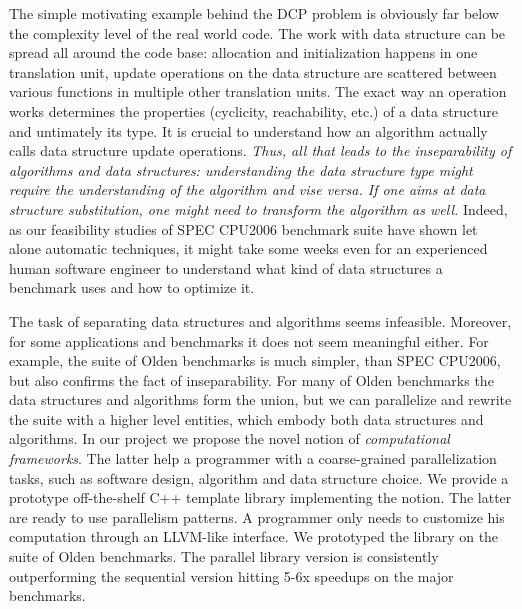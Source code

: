 \begin{description}[style=unboxed,leftmargin=0cm]
\item[Real world code complexity level] The simple motivating example behind the DCP problem is obviously far below the complexity level of the real world code. The work with data structure can be spread all around the code base: allocation and initialization happens in one translation unit, update operations on the data structure are scattered between various functions in multiple other translation units. The exact way an operation works determines the properties (cyclicity, reachability, etc.) of a data structure and untimately its type. It is crucial to understand how an algorithm actually calls data structure update operations. \textit{Thus, all that leads to the inseparability of algorithms and data structures: understanding the data structure type might require the understanding of the algorithm and vise versa. If one aims at data structure substitution, one might need to transform the algorithm as well.} Indeed, as our feasibility studies of SPEC CPU2006 benchmark suite have shown let alone automatic techniques, it might take some weeks even for an experienced human software engineer to understand what kind of data structures a benchmark uses and how to optimize it.
\end{description}
\quad The task of separating data structures and algorithms seems infeasible. Moreover, for some applications and benchmarks it does not seem meaningful either. For example, the suite of Olden benchmarks is much simpler, than SPEC CPU2006, but also confirms the fact of inseparability. For many of Olden benchmarks the data structures and algorithms form the union, but we can parallelize and rewrite the suite with a higher level entities, which embody both data structures and algorithms. In our project we propose the novel notion of \textit{computational frameworks}. The latter help a programmer with a coarse-grained parallelization tasks, such as software design, algorithm and data structure choice. We provide a prototype off-the-shelf C++ template library implementing the notion. The latter are ready to use parallelism patterns. A programmer only needs to customize his computation through an LLVM-like interface. We prototyped the library on the suite of Olden benchmarks. The parallel library version is consistently outperforming the sequential version hitting 5-6x speedups on the major benchmarks.\newline\null

